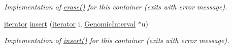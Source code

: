 \begin{CompactItemize}
\begin{CompactList}\small\item\em Implementation of \hyperlink{classGenomicIntervalSetAsArray_0f8554cfca150d695d15691aa42df7fa}{erase()} for this container (exits with error message). \item\end{CompactList}\item 
\hypertarget{classGenomicIntervalSetAsArray_0cd89244c0e75b88f9b56c9b9478d06b}{
\hyperlink{classGenomicInterval}{iterator} \hyperlink{classGenomicIntervalSetAsArray_0cd89244c0e75b88f9b56c9b9478d06b}{insert} (\hyperlink{classGenomicInterval}{iterator} i, \hyperlink{classGenomicInterval}{GenomicInterval} $\ast$u)}
\label{classGenomicIntervalSetAsArray_0cd89244c0e75b88f9b56c9b9478d06b}

\begin{CompactList}\small\item\em Implementation of \hyperlink{classGenomicIntervalSetAsArray_0cd89244c0e75b88f9b56c9b9478d06b}{insert()} for this container (exits with error message). \item\end{CompactList}\end{CompactItemize}
